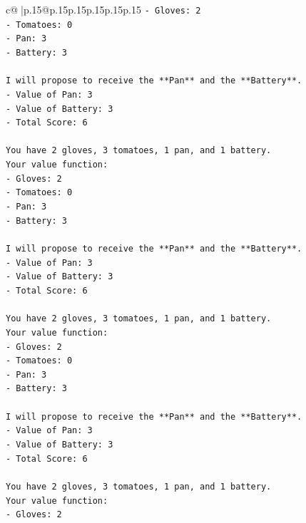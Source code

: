 \documentclass{article}
\begin{document}
{\begin{supertabular}{c@{$\;$}|p{.15\linewidth}@{}p{.15\linewidth}p{.15\linewidth}p{.15\linewidth}p{.15\linewidth}p{.15\linewidth}}
{{{\texttt{{-} Gloves: 2} \\
\texttt{{-} Tomatoes: 0} \\
\texttt{{-} Pan: 3} \\
\texttt{{-} Battery: 3} \\
\\ 
\texttt{I will propose to receive the **Pan** and the **Battery**.} \\
\texttt{{-} Value of Pan: 3} \\
\texttt{{-} Value of Battery: 3} \\
\texttt{{-} Total Score: 6} \\
\\ 
\texttt{You have 2 gloves, 3 tomatoes, 1 pan, and 1 battery.} \\
\texttt{Your value function:} \\
\texttt{{-} Gloves: 2} \\
\texttt{{-} Tomatoes: 0} \\
\texttt{{-} Pan: 3} \\
\texttt{{-} Battery: 3} \\
\\ 
\texttt{I will propose to receive the **Pan** and the **Battery**.} \\
\texttt{{-} Value of Pan: 3} \\
\texttt{{-} Value of Battery: 3} \\
\texttt{{-} Total Score: 6} \\
\\ 
\texttt{You have 2 gloves, 3 tomatoes, 1 pan, and 1 battery.} \\
\texttt{Your value function:} \\
\texttt{{-} Gloves: 2} \\
\texttt{{-} Tomatoes: 0} \\
\texttt{{-} Pan: 3} \\
\texttt{{-} Battery: 3} \\
\\ 
\texttt{I will propose to receive the **Pan** and the **Battery**.} \\
\texttt{{-} Value of Pan: 3} \\
\texttt{{-} Value of Battery: 3} \\
\texttt{{-} Total Score: 6} \\
\\ 
\texttt{You have 2 gloves, 3 tomatoes, 1 pan, and 1 battery.} \\
\texttt{Your value function:} \\
\texttt{{-} Gloves: 2} \\
}}}
\end{supertabular}}
\end{document}
